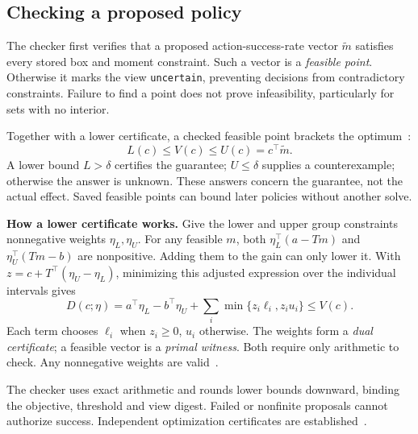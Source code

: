 \documentclass[conference]{IEEEtran}
\begin{document}
\subsection{Checking a proposed policy}
The checker first verifies that a proposed action-success-rate vector $\widetilde m$ satisfies every stored box and moment constraint. Such a vector is a \emph{feasible point}. Otherwise it marks the view \texttt{uncertain}, preventing decisions from contradictory constraints. Failure to find a point does not prove infeasibility, particularly for sets with no interior.

Together with a lower certificate, a checked feasible point brackets the optimum~\cite[Sec.~5.5.1]{Boyd2004Convex}:
\begin{equation}
 L(c)\le V(c)\le U(c)=c^\top\widetilde m.\label{eq:bracket}
\end{equation}
A lower bound $L>\delta$ certifies the guarantee; $U\le\delta$ supplies a counterexample; otherwise the answer is unknown. These answers concern the guarantee, not the actual effect. Saved feasible points can bound later policies without another solve.

\textbf{How a lower certificate works.} Give the lower and upper group constraints nonnegative weights $\eta_L,\eta_U$. For any feasible $m$, both $\eta_L^\top(a-Tm)$ and $\eta_U^\top(Tm-b)$ are nonpositive. Adding them to the gain can only lower it. With $z=c+T^\top(\eta_U-\eta_L)$, minimizing this adjusted expression over the individual intervals gives
\begin{equation}
 D(c;\eta)=a^\top\eta_L-b^\top\eta_U+
       \sum_i\min\{z_i\ell_i,z_i u_i\}\le V(c).\label{eq:dual}
\end{equation}
Each term chooses $\ell_i$ when $z_i\ge0$, $u_i$ otherwise. The weights form a \emph{dual certificate}; a feasible vector is a \emph{primal witness}. Both require only arithmetic to check. Any nonnegative weights are valid~\cite{Neumaier2004SafeBounds}.

The checker uses exact arithmetic and rounds lower bounds downward, binding the objective, threshold and view digest. Failed or nonfinite proposals cannot authorize success. Independent optimization certificates are established~\cite{Cheung2017VIPR}.


\end{document}
